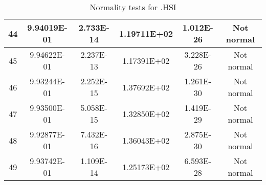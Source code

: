 \begin{table}[h]
\begin{tabular}{|c|c|c|c|c|c|}
		44 & 9.94019E-01 & 2.733E-14 & 1.19711E+02 & 1.012E-26 & Not normal\\\hline
		45 & 9.94622E-01 & 2.237E-13 & 1.17391E+02 & 3.228E-26 & Not normal\\\hline
		46 & 9.93244E-01 & 2.252E-15 & 1.37692E+02 & 1.261E-30 & Not normal\\\hline
		47 & 9.93500E-01 & 5.058E-15 & 1.32850E+02 & 1.419E-29 & Not normal\\\hline
		48 & 9.92877E-01 & 7.432E-16 & 1.36043E+02 & 2.875E-30 & Not normal\\\hline
		49 & 9.93742E-01 & 1.109E-14 & 1.25173E+02 & 6.593E-28 & Not normal\\\hline
	\end{tabular}
	\caption{Normality tests for .HSI}
\end{table}
